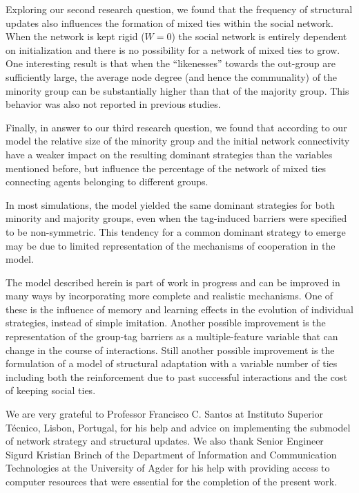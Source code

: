 Exploring our second research question, we found that the frequency of structural updates also influences the formation of mixed ties within the social network. When the network is kept rigid ($ W = 0 $) the social network is entirely dependent on initialization and there is no possibility for a network of mixed ties to grow. One interesting result is that when the ``likenesses'' towards the out-group are sufficiently large, the average node degree (and hence the communality) of the minority group can be substantially higher than that of the majority group. This behavior was also not reported in previous studies.

Finally, in answer to our third research question, we found that according to our model the relative size of the minority group and the initial network connectivity have a weaker impact on the resulting dominant strategies than the variables mentioned before, but influence the percentage of the network of mixed ties connecting agents belonging to different groups. 

In most simulations, the model yielded the same dominant strategies for both minority and majority groups, even when the tag-induced barriers were specified to be non-symmetric. This tendency for a common dominant strategy to emerge may be due to limited representation of the mechanisms of cooperation in the model.

The model described herein is part of work in progress and can be improved in many ways by incorporating more complete and realistic mechanisms. One of these is the influence of memory and learning effects in the evolution of individual strategies, instead of simple imitation. Another possible improvement is the representation of the group-tag barriers as a multiple-feature variable that can change in the course of interactions. Still another possible improvement is the formulation of a model of structural adaptation with a variable number of ties including both the reinforcement due to past successful interactions and the cost of keeping social ties.  

\begin{acknowledgements}
We are very grateful to Professor Francisco C. Santos at Instituto Superior T\'{e}cnico, Lisbon, Portugal, for his help and advice on implementing the submodel of network strategy and structural updates. We also thank Senior Engineer Sigurd Kristian Brinch of the Department of Information and Communication Technologies at the University of Agder for his help with providing access to computer resources that were essential for the completion of the present work.
\end{acknowledgements}

